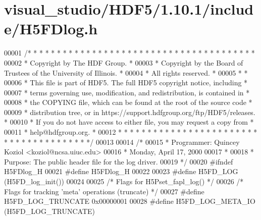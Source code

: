 \hypertarget{visual__studio_2_h_d_f5_21_810_81_2include_2_h5_f_dlog_8h_source}{}\section{visual\+\_\+studio/\+H\+D\+F5/1.10.1/include/\+H5\+F\+Dlog.h}
\label{visual__studio_2_h_d_f5_21_810_81_2include_2_h5_f_dlog_8h_source}

\begin{DoxyCode}
00001 \textcolor{comment}{/* * * * * * * * * * * * * * * * * * * * * * * * * * * * * * * * * * * * * * *}
00002 \textcolor{comment}{ * Copyright by The HDF Group.                                               *}
00003 \textcolor{comment}{ * Copyright by the Board of Trustees of the University of Illinois.         *}
00004 \textcolor{comment}{ * All rights reserved.                                                      *}
00005 \textcolor{comment}{ *                                                                           *}
00006 \textcolor{comment}{ * This file is part of HDF5.  The full HDF5 copyright notice, including     *}
00007 \textcolor{comment}{ * terms governing use, modification, and redistribution, is contained in    *}
00008 \textcolor{comment}{ * the COPYING file, which can be found at the root of the source code       *}
00009 \textcolor{comment}{ * distribution tree, or in https://support.hdfgroup.org/ftp/HDF5/releases.  *}
00010 \textcolor{comment}{ * If you do not have access to either file, you may request a copy from     *}
00011 \textcolor{comment}{ * help@hdfgroup.org.                                                        *}
00012 \textcolor{comment}{ * * * * * * * * * * * * * * * * * * * * * * * * * * * * * * * * * * * * * * */}
00013 
00014 \textcolor{comment}{/*}
00015 \textcolor{comment}{ * Programmer:  Quincey Koziol <koziol@ncsa.uiuc.edu>}
00016 \textcolor{comment}{ *              Monday, April 17, 2000}
00017 \textcolor{comment}{ *}
00018 \textcolor{comment}{ * Purpose: The public header file for the log driver.}
00019 \textcolor{comment}{ */}
00020 \textcolor{preprocessor}{#ifndef H5FDlog\_H}
00021 \textcolor{preprocessor}{#define H5FDlog\_H}
00022 
00023 \textcolor{preprocessor}{#define H5FD\_LOG    (H5FD\_log\_init())}
00024 
00025 \textcolor{comment}{/* Flags for H5Pset\_fapl\_log() */}
00026 \textcolor{comment}{/* Flags for tracking 'meta' operations (truncate) */}
00027 \textcolor{preprocessor}{#define H5FD\_LOG\_TRUNCATE   0x00000001}
00028 \textcolor{preprocessor}{#define H5FD\_LOG\_META\_IO    (H5FD\_LOG\_TRUNCATE)}

\end{DoxyCode}
